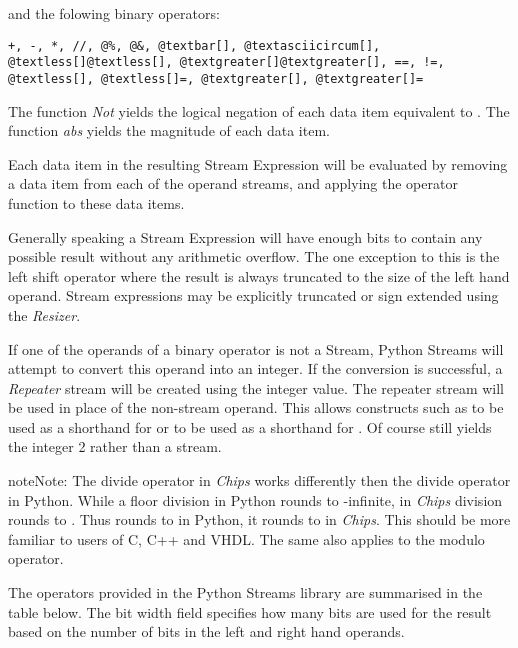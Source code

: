 \documentclass[letterpaper,10pt,english]{manual}
\begin{document}
and the folowing binary operators:

\begin{Verbatim}[commandchars=@\[\]]
+, -, *, //, @%, @&, @textbar[], @textasciicircum[], @textless[]@textless[], @textgreater[]@textgreater[], ==, !=, @textless[], @textless[]=, @textgreater[], @textgreater[]=
\end{Verbatim}

The function \emph{Not} yields the logical negation of each data item equivalent to
. The function \emph{abs} yields the magnitude of each data item.

Each data item in the resulting Stream Expression will be evaluated by removing
a data item from each of the operand streams, and applying the operator
function to these data items.

Generally speaking a Stream Expression will have enough bits to contain any
possible result without any arithmetic overflow. The one exception to this is
the left shift operator where the result is always truncated to the size of the
left hand operand. Stream expressions may be explicitly truncated or sign
extended using the \emph{Resizer}.

If one of the operands of a binary operator is not a Stream, Python Streams
will attempt to convert this operand into an integer. If the conversion is
successful, a \emph{Repeater} stream will be created using the integer value. The
repeater stream will be used in place of the non-stream operand. This allows
constructs such as  to be used as a shorthand for  or  to be used as
a shorthand for .  Of course 
still yields the integer 2 rather than a stream.

\begin{notice}{note}{Note:}
The divide \code{//} operator in \emph{Chips} works differently then the divide
operator in Python.  While a floor division in Python rounds to -infinite,
in \emph{Chips} division rounds to . Thus  rounds to  in
Python, it rounds to  in \emph{Chips}. This should be more familiar to
users of C, C++ and VHDL. The same also applies to the modulo \code{\%}
operator.
\end{notice}

The operators provided in the Python Streams library are summarised in the
table below. The bit width field specifies how many bits are used for the
result based on the number of bits in the left and right hand operands.
\end{document}
